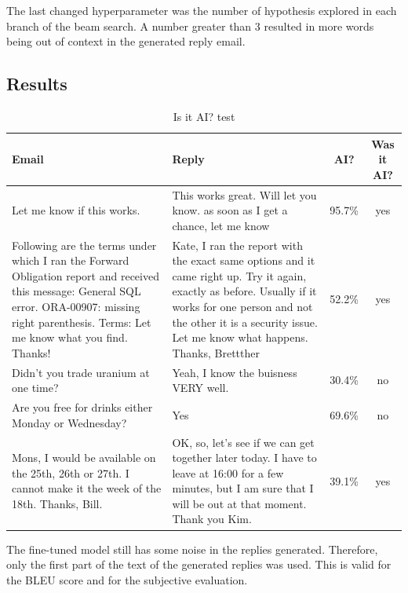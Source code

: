\documentclass[letterpaper]{article}
\begin{document}
The last changed hyperparameter was the number of hypothesis explored in each branch of the beam search. A number greater than \num{3} resulted in more words being out of context in the generated reply email.

\subsection{Results}

\begin{table}[ht]
    \centering
    \begin{tabularx}{\textwidth}{|X|X|c|c|}
        \hline
        \textbf{Email} & \textbf{Reply} & \textbf{AI?} & \textbf{Was it AI?} \\
        \hline
        Let me know if this works. & This works great. Will let you know. as soon as I get a chance, let me know & \num{95.7}{\%} & yes \\
        \hline
        Following are the terms under which I ran the Forward Obligation report and received this message: General SQL error. ORA-00907: missing right parenthesis. Terms: Let me know what you find. Thanks! & Kate, I ran the report with the exact same options and it came right up. Try it again, exactly as before. Usually if it works for one person and not the other it is a security issue. Let me know what happens. Thanks, Brettther & \num{52.2}{\%} & yes \\
        \hline
        Didn't you trade uranium at one time? & Yeah, I know the buisness VERY well. & \num{30.4}{\%} & no \\
        \hline
        Are you free for drinks either Monday or Wednesday? & Yes & \num{69.6}{\%} & no \\
        \hline
        Mons, I would be available on the 25th, 26th or 27th. I cannot make it the week of the 18th. Thanks, Bill. & OK, so, let's see if we can get together later today. I have to leave at 16:00 for a few minutes, but I am sure that I will be out at that moment. Thank you Kim. & \num{39.1}{\%} & yes \\
        \hline
    \end{tabularx}
    \caption{Is it AI? test}
    \label{table:is-it-ai-test}
\end{table}

The fine-tuned model still has some noise in the replies generated. Therefore, only the first part of the text of the generated replies was used. This is valid for the BLEU score and for the subjective evaluation.
\end{document}
